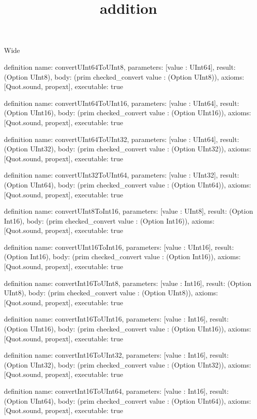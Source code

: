 \begin{lexlean}{Wide}
\title{addition}
\begin{semanticmodule}
definition{
  name: convertUInt64ToUInt8,
  parameters: [value : UInt64],
  result: (Option UInt8),
  body: (prim checked_convert value : (Option UInt8)),
  axioms: [Quot.sound, propext],
  executable: true
}

definition{
  name: convertUInt64ToUInt16,
  parameters: [value : UInt64],
  result: (Option UInt16),
  body: (prim checked_convert value : (Option UInt16)),
  axioms: [Quot.sound, propext],
  executable: true
}

definition{
  name: convertUInt64ToUInt32,
  parameters: [value : UInt64],
  result: (Option UInt32),
  body: (prim checked_convert value : (Option UInt32)),
  axioms: [Quot.sound, propext],
  executable: true
}

definition{
  name: convertUInt32ToUInt64,
  parameters: [value : UInt32],
  result: (Option UInt64),
  body: (prim checked_convert value : (Option UInt64)),
  axioms: [Quot.sound, propext],
  executable: true
}

definition{
  name: convertUInt8ToInt16,
  parameters: [value : UInt8],
  result: (Option Int16),
  body: (prim checked_convert value : (Option Int16)),
  axioms: [Quot.sound, propext],
  executable: true
}

definition{
  name: convertUInt16ToInt16,
  parameters: [value : UInt16],
  result: (Option Int16),
  body: (prim checked_convert value : (Option Int16)),
  axioms: [Quot.sound, propext],
  executable: true
}

definition{
  name: convertInt16ToUInt8,
  parameters: [value : Int16],
  result: (Option UInt8),
  body: (prim checked_convert value : (Option UInt8)),
  axioms: [Quot.sound, propext],
  executable: true
}

definition{
  name: convertInt16ToUInt16,
  parameters: [value : Int16],
  result: (Option UInt16),
  body: (prim checked_convert value : (Option UInt16)),
  axioms: [Quot.sound, propext],
  executable: true
}

definition{
  name: convertInt16ToUInt32,
  parameters: [value : Int16],
  result: (Option UInt32),
  body: (prim checked_convert value : (Option UInt32)),
  axioms: [Quot.sound, propext],
  executable: true
}

definition{
  name: convertInt16ToUInt64,
  parameters: [value : Int16],
  result: (Option UInt64),
  body: (prim checked_convert value : (Option UInt64)),
  axioms: [Quot.sound, propext],
  executable: true
}


\end{semanticmodule}
\end{lexlean}
